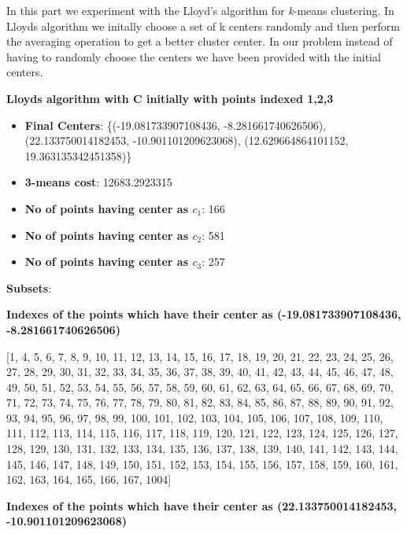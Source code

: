 \documentclass[11pt]{article}
\begin{document}
\begin{itemize}
In this part we experiment with the Lloyd's algorithm for \emph k-means clustering. In Lloyds algorithm we initally choose a set of k centers randomly and then perform the averaging operation to get a better cluster center. In our problem instead of having to randomly choose the centers we have been provided with the initial centers.

\textbf{ Lloyds algorithm with C initially with points indexed {1,2,3} }\\
\begin{itemize}
	\item[] \textbf{Final Centers}: \{(-19.081733907108436, -8.281661740626506), (22.133750014182453, -10.901101209623068), (12.629664864101152, 19.363135342451358)\}
	
	\item[] \textbf{3-means cost}: 12683.2923315
	\item[] \textbf{No of points having center as $c_1$}: 166 
	\item[] \textbf{No of points having center as $c_2$}: 581 
	\item[] \textbf{No of points having center as $c_3$}: 257 
\end{itemize}

\textbf{Subsets}:

\textbf{Indexes of the points which have their center as  (-19.081733907108436, -8.281661740626506)}

[1, 4, 5, 6, 7, 8, 9, 10, 11, 12, 13, 14, 15, 16, 17, 18, 19, 20, 21, 22, 23, 24, 25, 26, 27, 28, 29, 30, 31, 32, 33, 34, 35, 36, 37, 38, 39, 40, 41, 42, 43, 44, 45, 46, 47, 48, 49, 50, 51, 52, 53, 54, 55, 56, 57, 58, 59, 60, 61, 62, 63, 64, 65, 66, 67, 68, 69, 70, 71, 72, 73, 74, 75, 76, 77, 78, 79, 80, 81, 82, 83, 84, 85, 86, 87, 88, 89, 90, 91, 92, 93, 94, 95, 96, 97, 98, 99, 100, 101, 102, 103, 104, 105, 106, 107, 108, 109, 110, 111, 112, 113, 114, 115, 116, 117, 118, 119, 120, 121, 122, 123, 124, 125, 126, 127, 128, 129, 130, 131, 132, 133, 134, 135, 136, 137, 138, 139, 140, 141, 142, 143, 144, 145, 146, 147, 148, 149, 150, 151, 152, 153, 154, 155, 156, 157, 158, 159, 160, 161, 162, 163, 164, 165, 166, 167, 1004]

\textbf{Indexes of the points which have their center as  (22.133750014182453, -10.901101209623068)}


\end{itemize}
\end{document}
